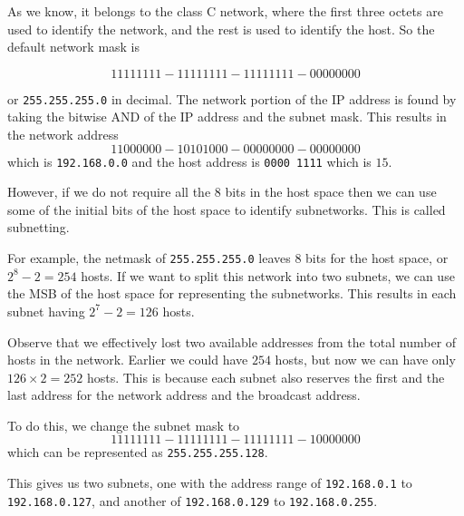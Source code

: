 As we know, it belongs to the class C network,
where the first three octets are used to identify
the network, and the rest is used to identify the
host. So the default network mask is

\[
1111 1111 - 1111 1111 - 1111 1111 - 0000 0000
\]

or \lstinline|255.255.255.0| in decimal.
The network portion of the IP address is
found by taking the bitwise AND
of the IP address and the subnet mask.
This results in the network address
\[
1100 0000 - 1010 1000 - 0000 0000 - 0000 0000
\]
which is \lstinline|192.168.0.0| and the host address
is \lstinline|0000 1111| which is $15$.

However, if we do not require all the 8 bits in the
host space
then we can use some of the initial bits of the
host space to identify subnetworks. This is called
subnetting.

For example, the netmask of \lstinline|255.255.255.0|
leaves 8 bits for the host space, or $2^8 - 2 = 254$
hosts. If we want to split this network into
two subnets, we can use the MSB of the host space
for representing the subnetworks. This results in
each subnet having $2^7 - 2 = 126$ hosts.

\begin{remark}
Observe that we effectively lost two available addresses
from the total number of hosts in the network.
Earlier we could have $254$ hosts, but now we can
have only $126 \times 2 = 252$ hosts. This is because
each subnet also reserves the first and the last
address for the network address and the broadcast
address.
\end{remark}

To do this, we change the subnet mask to
\[
1111 1111 - 1111 1111 - 1111 1111 - 1000 0000
\]
which can be represented as \lstinline|255.255.255.128|.

This gives us two subnets, one with the address range
of \lstinline|192.168.0.1| to \lstinline|192.168.0.127|, and
another of \lstinline|192.168.0.129| to \lstinline|192.168.0.255|.

